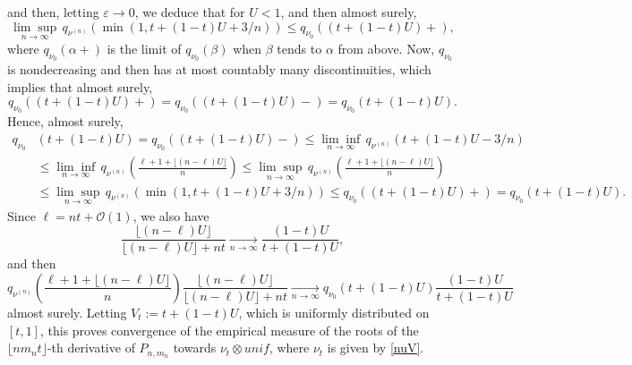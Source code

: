 \documentclass[11pt]{amsart}
\begin{document}
and then, letting $\varepsilon \rightarrow 0$, 
we deduce that for $U <1$, and then almost surely, 
$$ \underset{n \rightarrow \infty}{\lim \sup} \, q_{\nu^{(n)}} \left( \min(1, t + (1-t)U + 3/n)   \right) \leq q_{\nu_0} \left( ( t + (1-t)U)+  \right),$$
where $q_{\nu_0}(\alpha+)$ is the limit of $q_{\nu_0} (\beta)$ when $\beta$ tends to $\alpha$ from above. 
Now, $q_{\nu_0}$ is nondecreasing and then has 
at most countably many discontinuities, which implies that almost surely, 
$$  q_{\nu_0} \left( ( t + (1-t)U)+  \right)
=  q_{\nu_0} \left( ( t + (1-t)U)-  \right)
=  q_{\nu_0} \left(  t + (1-t)U  \right).$$
Hence, almost surely,
\begin{align*} 
 q_{\nu_0} & \left(  t + (1-t)U  \right)
  =  q_{\nu_0} \left( ( t + (1-t)U)-  \right)
 \leq \underset{n \rightarrow \infty}{\lim \inf} \, 
q_{\nu^{(n)}} \left( t + (1-t)U - 3/n   \right)
\\ & \leq \underset{n \rightarrow \infty}{\lim \inf} \, q_{\nu^{(n)}} \left( \frac{ \ell + 1 + \lfloor (n-\ell) U \rfloor}{n} \right)
  \leq \underset{n \rightarrow \infty}{\lim \sup} \, q_{\nu^{(n)}} \left( \frac{ \ell + 1 + \lfloor (n-\ell) U \rfloor}{n} \right)
\\ & \leq \underset{n \rightarrow \infty}{\lim \sup} \,
q_{\nu^{(n)}} \left( \min(1, t + (1-t)U + 3/n)   \right)   \leq q_{\nu_0} \left( ( t + (1-t)U)+  \right) 
=  q_{\nu_0} \left(  t + (1-t)U  \right).
\end{align*}
Since $\ell = nt + \mathcal{O}(1)$, we also have 
$$\frac{\lfloor (n-\ell) U \rfloor}{\lfloor (n-\ell) U \rfloor + nt} \underset{n \rightarrow 
\infty}{\longrightarrow}  \frac{ (1-t)U}{t + (1-t)U},$$ 
and then 
$$ q_{\nu^{(n)}} \left( \frac{ \ell + 1 + \lfloor (n-\ell) U \rfloor}{n} \right) \frac{\lfloor (n-\ell) U \rfloor}{\lfloor (n-\ell) U \rfloor + nt}
\underset{n \rightarrow 
\infty}{\longrightarrow} 
 q_{\nu_0} \left(  t + (1-t)U  \right) \frac{ (1-t)U}{t + (1-t)U}
$$
almost surely. Letting 
$V_t := t + (1-t) U$, which is uniformly distributed 
on $[t,1]$, 
this proves convergence of 
the empirical measure of the roots of the $\lfloor n m_n t \rfloor$-th derivative of  
$P_{n,m_n}$ towards $\nu_t \otimes unif$, 
where $\nu_t$ is given by \eqref{nuV}. 
\end{document}
